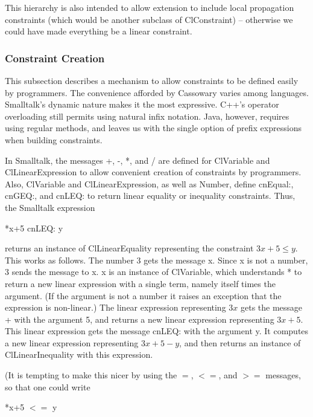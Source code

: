\documentclass{article}
\begin{document}
This hierarchy is also intended to allow extension to include local
propagation constraints (which would be another subclass of {\sf
ClConstraint}) -- otherwise we could have made everything be a linear
constraint. 

\subsubsection{Constraint Creation}
\label{constraint-creation}

This subsection describes a mechanism to allow constraints to be defined
easily by programmers.  The convenience afforded by Cassowary varies
among languages.  Smalltalk's dynamic nature makes it the most
expressive.  C++'s operator overloading still permits using natural
infix notation.  Java, however, requires using regular methods, and
leaves us with the single option of prefix expressions when building
constraints.

In Smalltalk, the messages +, -, *, and / are defined for {\sf
  ClVariable} and {\sf ClLinearExpression} to allow convenient creation
of constraints by programmers.  Also, {\sf ClVariable} and {\sf
  ClLinearExpression}, as well as {\sf Number}, define {\sf cnEqual:},
{\sf cnGEQ:}, and {\sf cnLEQ:} to return linear equality or inequality
constraints.  Thus, the Smalltalk expression

\hspace*{1cm} {*x+5 cnLEQ: y}

returns an instance of {\sf ClLinearEquality} representing the
constraint $3 x + 5 \leq y$.  This works as follows.  The number 3 gets
the message {\sf * x}.  Since {\sf x} is not a number, 3 sends the
message {} to {\sf x}.  {\sf x} is an instance of {\sf
  ClVariable}, which understands * to return a new linear expression
with a single term, namely itself times the argument.  (If the argument
is not a number it raises an exception that the expression is
non-linear.)  The linear expression representing $3x$ gets the message +
with the argument 5, and returns a new linear expression representing $3
x + 5$.  This linear expression gets the message {\sf cnLEQ:} with the
argument {\sf y}.  It computes a new linear expression representing $3 x
+ 5 - y$, and then returns an instance of {\sf ClLinearInequality} with
this expression.

(It is tempting to make this nicer by using the $=$, $<=$, and $>=$
messages, so that one could write

\hspace*{1 cm} {*x+5 $<=$ y}
\end{document}
